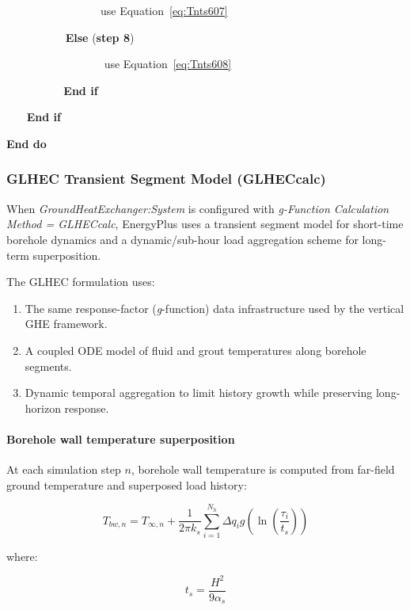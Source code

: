 ~~~~~~~~~~~~~~~~~use Equation~\ref{eq:Tnts607}

~~~~~~~~~~ \textbf{Else} (\textbf{step 8})

~~~~~~~~~~~~~~~~~ use Equation~\ref{eq:Tnts608}

~~~ ~~~~~~ \textbf{End if}

~~~ \textbf{End if}

\textbf{End do}

\subsubsection{GLHEC Transient Segment Model (GLHECcalc)}\label{glhec-transient-segment-model-glheccalc}

When \emph{GroundHeatExchanger:System} is configured with \emph{g-Function Calculation Method = \mbox{GLHECcalc}}, EnergyPlus uses a transient segment model for short-time borehole dynamics and a dynamic/sub-hour load aggregation scheme for long-term superposition.

The GLHEC formulation uses:

\begin{enumerate}
\item The same response-factor (\emph{g}-function) data infrastructure used by the vertical GHE framework.
\item A coupled ODE model of fluid and grout temperatures along borehole segments.
\item Dynamic temporal aggregation to limit history growth while preserving long-horizon response.
\end{enumerate}

\paragraph{Borehole wall temperature superposition}\label{borehole-wall-temperature-superposition}

At each simulation step \(n\), borehole wall temperature is computed from far-field ground temperature and superposed load history:

\begin{equation}
T_{bw,n} = T_{\infty,n} + \frac{1}{2\pi k_s}\sum_{i=1}^{N_h} \Delta q_i g\left(\ln\left(\frac{\tau_i}{t_s}\right)\right)
\end{equation}

where:

\begin{equation}
t_s = \frac{H^2}{9\alpha_s}
\end{equation}

